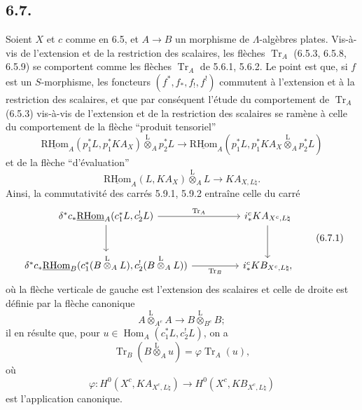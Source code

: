 \documentclass[11pt]{article}
\DeclareMathOperator{\Hom}{Hom}
\newcommand{\R}{\mathrm{R}}\newcommand{\RHomCore}{\mathrm{RHom}}
\providecommand{\RHom}{\RHomCore}
\providecommand{\uRHom}{\underline{\RHom}}
\providecommand{\Tr}{\operatorname{Tr}}
\providecommand{\Tr}{\operatorname{Tr}}
\providecommand{\lten}{\overset{\mathrm L}{\otimes}}
\providecommand{\Tr}{\operatorname{Tr}}
\providecommand{\RHom}{\RHomCore}
\providecommand{\Hom}{\operatorname{Hom}}
\providecommand{\lten}{\overset{\mathrm L}{\otimes}}
\providecommand{\RHom}{\R\mathcal{H}om}
\providecommand{\lten}{\overset{\mathrm L}{\otimes}}
\providecommand{\R}{\mathrm R}
\providecommand{\Tr}{\operatorname{Tr}}
\providecommand{\lten}{\overset{\mathrm L}{\otimes}}
\providecommand{\lten}{\overset{\mathrm L}{\otimes}}
\providecommand{\lten}{\overset{\mathrm L}{\otimes}}
\providecommand{\RHom}{\RHomCore}
\providecommand{\Hom}{\operatorname{Hom}}
\providecommand{\Tr}{\operatorname{Tr}}
\providecommand{\lten}{\overset{\mathrm L}{\otimes}}
\begin{document}
\subsection*{6.7.}
Soient $X$ et $c$ comme en 6.5, et $A\to B$ un morphisme de $\Lambda$-algèbres plates. Vis-à-vis de l'extension et de la restriction des scalaires, les flèches $\Tr_A$ (6.5.3, 6.5.8, 6.5.9) se comportent comme les flèches $\Tr_A$ de 5.6.1, 5.6.2. Le point est que, si $f$ est un $S$-morphisme, les foncteurs $(f^*,f_*,f_!,f^!)$ commutent à l'extension et à la restriction des scalaires, et que par conséquent l'étude du comportement de $\Tr_A$ (6.5.3) vis-à-vis de l'extension et de la restriction des scalaires se ramène à celle du comportement de la flèche ``produit tensoriel''
\[
\uRHom_A(p_1^*L,p_1^*KA_X)\lten_Ap_2^*L
\longrightarrow
\uRHom_A(p_1^*L,p_1^*KA_X\lten_Ap_2^*L)
\]
et de la flèche ``d'évaluation''
\[
\uRHom_A(L,KA_X)\lten_A L\longrightarrow KA_{X,L\natural}.
\]
Ainsi, la commutativité des carrés 5.9.1, 5.9.2 entraîne celle du carré
\begin{equation}
\begin{tikzcd}[column sep=huge,row sep=large]
\delta^*c_*\uRHom_A(c_1^*L,c_2^!L) \arrow[r,"\Tr_A"] \arrow[d]
& i_*^cKA_{X^c,L\natural} \arrow[d]\\
\delta^*c_*\uRHom_B(c_1^*(B\lten_A L),c_2^!(B\lten_A L)) \arrow[r,"\Tr_B"']
& i_*^cKB_{X^c,L\natural},
\end{tikzcd}
\tag{6.7.1}
\end{equation}
où la flèche verticale de gauche est l'extension des scalaires et celle de droite est définie par la flèche canonique
\[
A\lten_{A^e}A\longrightarrow B\lten_{B^e}B;
\]
il en résulte que, pour $u\in\Hom_A(c_1^*L,c_2^!L)$, on a
\begin{equation}
\Tr_B(B\lten_Au)=\varphi\Tr_A(u),
\tag{6.7.2}
\end{equation}
où
\[
\varphi:H^0(X^c,KA_{X^c,L\natural})\longrightarrow H^0(X^c,KB_{X^c,L\natural})
\]
est l'application canonique.
\end{document}
